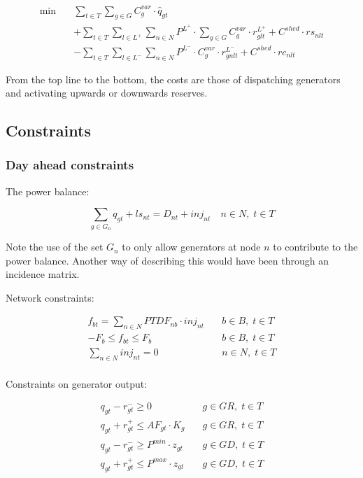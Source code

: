 \documentclass[number,times]{elsarticle}
\begin{document}
\begin{align}
    \min \quad & \sum_{t \in T} \sum_{g \in G} C^{var}_{g} \cdot \hat{q}_{gt} \nonumber                                                                  \\
               & + \sum_{t \in T} \sum_{l \in L^+} \sum_{n \in N} P^{L^+} \cdot \sum_{g \in G} C^{var}_{g} \cdot r^{L^+}_{glt} + C^{shed} \cdot rs_{nlt} \\
               & - \sum_{t \in T} \sum_{l \in L^-} \sum_{n \in N} P^{L^-} \cdot C^{var}_{g} \cdot r^{L^-}_{gnlt} + C^{shed} \cdot rc_{nlt} \nonumber
\end{align}

From the top line to the bottom, the costs are those of dispatching generators and activating upwards or downwards reserves.

\subsection{Constraints}

\subsubsection{Day ahead constraints}

The power balance:

\begin{equation}
    \sum_{g \in G_n} q_{gt} + ls_{nt} = D_{nt} + inj_{nt} \quad n \in N, \; t \in T
\end{equation}

Note the use of the set $G_n$ to only allow generators at node $n$ to contribute to the power balance. Another way of describing this would have been through an incidence matrix.

Network constraints:

\begin{align}
    f_{bt} = \sum_{n \in N} PTDF_{nb} \cdot inj_{nt} & \quad b \in B, \; t \in T \\
    -F_b \leq f_{bt} \leq F_b                        & \quad b \in B, \; t \in T \\
    \sum_{n \in N} inj_{nt} = 0                      & \quad n \in N, \; t \in T \\
\end{align}

Constraints on generator output:

\begin{align}
    q_{gt} - r^{-}_{gt} \geq 0                    & \quad g \in GR, \; t \in T \\
    q_{gt} + r^{+}_{gt} \leq AF_{gt} \cdot K_g    & \quad g \in GR, \; t \in T \\
    q_{gt} - r^{-}_{gt} \geq P^{min} \cdot z_{gt} & \quad g \in GD, \; t \in T \\
    q_{gt} + r^{+}_{gt} \leq P^{max} \cdot z_{gt} & \quad g \in GD, \; t \in T
\end{align}
\end{document}
